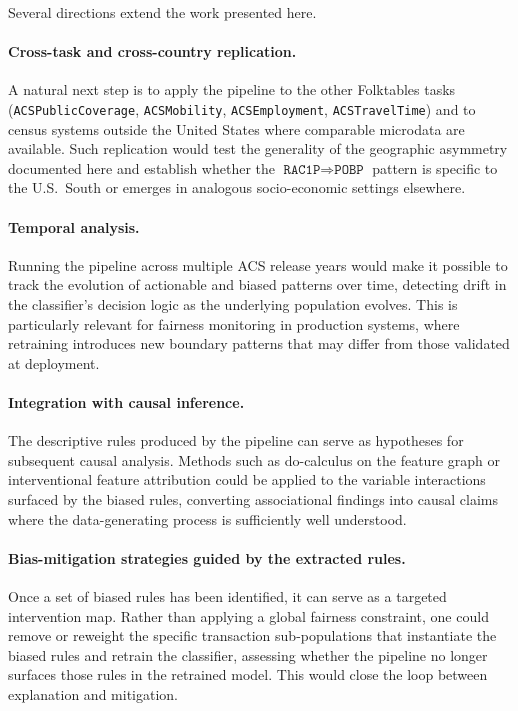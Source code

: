Several directions extend the work presented here.

\paragraph{Cross-task and cross-country replication.} A natural next step is to apply the pipeline to the other Folktables tasks (\texttt{ACSPublicCoverage}, \texttt{ACSMobility}, \texttt{ACSEmployment}, \texttt{ACSTravelTime}) and to census systems outside the United States where comparable microdata are available. Such replication would test the generality of the geographic asymmetry documented here and establish whether the $\texttt{RAC1P} \Rightarrow \texttt{POBP}$ pattern is specific to the U.S.\ South or emerges in analogous socio-economic settings elsewhere.

\paragraph{Temporal analysis.} Running the pipeline across multiple ACS release years would make it possible to track the evolution of actionable and biased patterns over time, detecting drift in the classifier's decision logic as the underlying population evolves. This is particularly relevant for fairness monitoring in production systems, where retraining introduces new boundary patterns that may differ from those validated at deployment.

\paragraph{Integration with causal inference.} The descriptive rules produced by the pipeline can serve as hypotheses for subsequent causal analysis. Methods such as do-calculus on the feature graph or interventional feature attribution could be applied to the variable interactions surfaced by the biased rules, converting associational findings into causal claims where the data-generating process is sufficiently well understood.

\paragraph{Bias-mitigation strategies guided by the extracted rules.} Once a set of biased rules has been identified, it can serve as a targeted intervention map. Rather than applying a global fairness constraint, one could remove or reweight the specific transaction sub-populations that instantiate the biased rules and retrain the classifier, assessing whether the pipeline no longer surfaces those rules in the retrained model. This would close the loop between explanation and mitigation.

